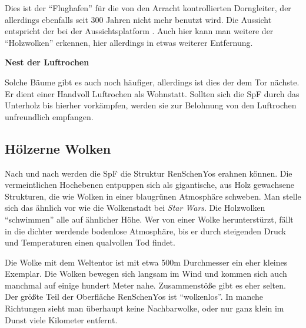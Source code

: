 \documentclass[
a4paper,
twoside,
DIV=calc,
BCOR=4mm,
fontsize=9pt,
twocolumn=on,
titlepage=on,
parskip=half
]{scrartcl}
\begin{document}

Dies ist der "`Flughafen"' für die von den Arracht kontrollierten
Dorngleiter, der allerdings ebenfalls seit 300 Jahren nicht mehr
benutzt wird. Die Aussicht entspricht der bei der Aussichtsplatform
. Auch hier kann man weitere der "`Holzwolken"' erkennen, hier
allerdings in etwas weiterer Entfernung.

\textbf{ Nest der Luftrochen}


Solche Bäume gibt es auch noch häufiger, allerdings ist dies der dem
Tor nächste. Er dient einer Handvoll Luftrochen als Wohnstatt. Sollten
sich die SpF durch das Unterholz bis hierher vorkämpfen, werden sie
zur Belohnung von den Luftrochen unfreundlich empfangen.

\subsection{Hölzerne Wolken}
\label{holzwolken}

Nach und nach werden die SpF die Struktur RenSchenYos erahnen
können. Die vermeintlichen Hochebenen entpuppen sich als gigantische,
aus Holz gewachsene Strukturen, die wie Wolken in einer blaugrünen
Atmosphäre schweben. Man stelle sich das ähnlich vor wie die
Wolkenstadt bei \emph{Star Wars}. Die Holzwolken "`schwimmen"' alle
auf ähnlicher Höhe. Wer von einer Wolke herunterstürzt, fällt in die
dichter werdende bodenlose Atmosphäre, bis er durch steigenden Druck
und Temperaturen einen qualvollen Tod findet.

Die Wolke mit dem Weltentor ist mit etwa 500m Durchmesser ein eher
kleines Exemplar. Die Wolken bewegen sich langsam im Wind und kommen
sich auch manchmal auf einige hundert Meter nahe. Zusammenstöße gibt
es eher selten. Der größte Teil der Oberfläche RenSchenYos ist
"`wolkenlos"'. In manche Richtungen sieht man überhaupt keine
Nachbarwolke, oder nur ganz klein im Dunst viele Kilometer entfernt.
\end{document}
